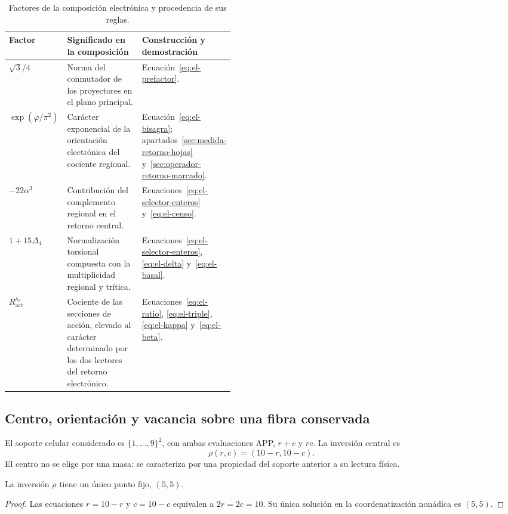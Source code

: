 \begin{table}[htbp]
\centering
\small
\setlength{\tabcolsep}{4pt}
\renewcommand{\arraystretch}{1.18}
\begin{tabularx}{\linewidth}{@{}p{0.20\linewidth}Xp{0.24\linewidth}@{}}
\toprule
Factor & Significado en la composición & Construcción y demostración\\
\midrule
\(\sqrt3/4\)
 & Norma del conmutador de los proyectores en el plano principal.
 & Ecuación~\eqref{eq:el-prefactor}.\\
\(\exp(\varphi/\pi^2)\)
 & Carácter exponencial de la orientación electrónica del cociente regional.
 & Ecuación~\eqref{eq:el-bisagra}; apartados~\ref{sec:medida-retorno-hojas}
   y~\ref{sec:operador-retorno-marcado}.\\
\(-22\alpha^3\)
 & Contribución del complemento regional en el retorno central.
 & Ecuaciones~\eqref{eq:el-selector-enteros} y~\eqref{eq:el-censo}.\\
\(1+15\Delta_4\)
 & Normalización torsional compuesta con la multiplicidad regional
   y trítica.
 & Ecuaciones~\eqref{eq:el-selector-enteros}, \eqref{eq:el-delta}
   y~\eqref{eq:el-basal}.\\
\(R_{\mathrm{act}}^{\kappa_e}\)
 & Cociente de las secciones de acción, elevado al carácter determinado
   por los dos lectores del retorno electrónico.
 & Ecuaciones~\eqref{eq:el-ratio}, \eqref{eq:el-triple},
   \eqref{eq:el-kappa} y~\eqref{eq:el-beta}.\\
\bottomrule
\end{tabularx}
\caption{Factores de la composición electrónica y procedencia de sus reglas.}
\label{tab:el-factores}
\end{table}



\subsection{Centro, orientación y vacancia sobre una fibra conservada}

El soporte celular considerado es \(\{1,\ldots,9\}^2\), con ambas
evaluaciones APP, \(r+c\) y \(rc\). La inversión central es
\begin{equation}
 \rho(r,c)=(10-r,10-c).
 \label{eq:el-inversion-central}
\end{equation}
El centro no se elige por una masa: se caracteriza por una propiedad del
soporte anterior a su lectura física.

\begin{proposition}
La inversión \(\rho\) tiene un único punto fijo, \((5,5)\).
\end{proposition}
\begin{proof}
Las ecuaciones \(r=10-r\) y \(c=10-c\) equivalen a
\(2r=2c=10\). Su única solución en la coordenatización nonádica es \((5,5)\).
\end{proof}

